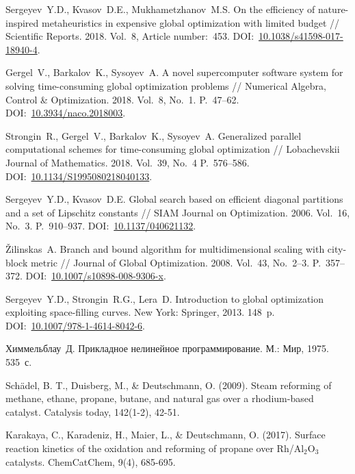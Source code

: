 \documentclass{cmi}
\begin{document}
\begin{biblio}
Sergeyev~Y.D., Kvasov~D.E., Mukhametzhanov~M.S. On the efficiency of nature-inspired metaheuristics in expensive global optimization with limited budget // Scientific Reports. 2018. Vol.~8, Article number:~453. DOI:~\href{http://dx.doi.org/10.1038/s41598-017-18940-4}{10.1038/s41598-017-18940-4}.

Gergel~V., Barkalov~K., Sysoyev~A. A novel supercomputer software system for solving time-consuming global optimization problems // Numerical Algebra, Control \& Optimization. 2018. Vol.~8, No.~1. P.~47--62. DOI:~\href{http://dx.doi.org/10.3934/naco.2018003}{10.3934/naco.2018003}.

Strongin~R., Gergel~V., Barkalov~K., Sysoyev~A. Generalized parallel computational schemes for time-consuming global optimization //  Lobachevskii Journal of Mathematics. 2018. Vol.~39, No.~4 P.~576--586. DOI:~\href{http://dx.doi.org/10.1134/S1995080218040133}{10.1134/S1995080218040133}.

Sergeyev~Y.D., Kvasov~D.E. Global search based on efficient diagonal partitions and a set of Lipschitz constants // SIAM Journal on Optimization. 2006. Vol.~16, No.~3. P.~910--937. DOI:~\href{http://dx.doi.org/10.1137/040621132}{10.1137/040621132}.

Žilinskas~A. Branch and bound algorithm for multidimensional scaling with city-block metric // Journal of Global Optimization. 2008. Vol.~43, No.~2--3. P.~357--372. DOI:~\href{http://dx.doi.org/10.1007/s10898-008-9306-x}{10.1007/s10898-008-9306-x}.

Sergeyev~Y.D., Strongin~R.G., Lera~D. Introduction to global optimization exploiting space-filling curves. New York: Springer, 2013. 148~p. DOI:~\href{http://dx.doi.org/10.1007/978-1-4614-8042-6}{10.1007/978-1-4614-8042-6}.

Химмельблау~Д. Прикладное нелинейное программирование. М.: Мир, 1975. 535~с.

Schädel, B. T., Duisberg, M., & Deutschmann, O. (2009). Steam reforming of methane, ethane, propane, butane, and natural gas over a rhodium-based catalyst. Catalysis today, 142(1-2), 42-51.

Karakaya, C., Karadeniz, H., Maier, L., & Deutschmann, O. (2017). Surface reaction kinetics of the oxidation and reforming of propane over Rh/Al$_{2}$O$_{3}$ catalysts. ChemCatChem, 9(4), 685-695.


\end{biblio}
\end{document}
